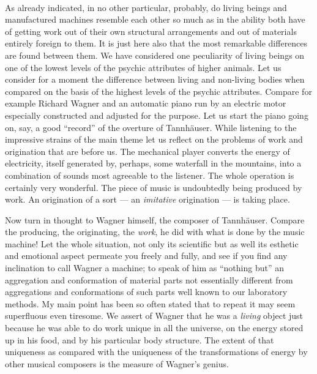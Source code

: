 \documentclass[a4paper, 11pt, oneside, polutonikogreek, english]{article}
\begin{document}
\paragraph{}
As already indicated, in no other particular, probably, do living beings and manufactured machines resemble each other so much as in the ability both have of getting work out of their own structural arrangements and out of materials entirely foreign to them. It is just here also that the most remarkable differences are found between them. We have considered one peculiarity of living beings on one of the lowest levels of the psychic attributes of higher animals. Let us consider for a moment the difference between living and non-living bodies when compared on the basis of the highest levels of the psychic attributes. Compare for example Richard Wagner and an automatic piano run by an electric motor especially constructed and adjusted for the purpose. Let us start the piano going on, say, a good ``record'' of the overture of Tannhäuser. While listening to the impressive strains of the main theme let us reflect on the problems of work and origination that are before us. The mechanical player converts the energy of electricity, itself generated by, perhaps, some waterfall in the mountains, into a combination of sounds most agreeable to the listener. The whole operation is certainly very wonderful. The piece of music is undoubtedly being produced by work. An origination of a sort --- an \emph{imitative} origination --- is taking place.

Now turn in thought to Wagner himself, the composer of Tannhäuser. Compare the producing, the originating, the \emph{work}, he did with what is done by the music machine! Let the whole situation, not only its scientific but as well its esthetic and emotional aspect permeate you freely and fully, and see if you find any inclination to call Wagner a machine; to speak of him as ``nothing but'' an aggregation and conformation of material parts not essentially different from aggregations and conformations of such parts well known to our laboratory methods. My main point has been so often stated that to repeat it may seem superfluous even tiresome. We assert of Wagner that he was a \emph{living} object just because he was able to do work unique in all the universe, on the energy stored up in his food, and by his particular body structure. The extent of that uniqueness as compared with the uniqueness of the transformations of energy by other musical composers is the measure of Wagner's genius.
\end{document}

